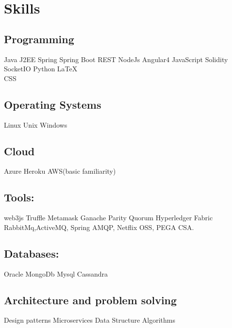 \documentclass[]{deedy-resume-openfont}
\begin{document}
\begin{minipage}[t]{0.33\textwidth}

\section{Skills}
\subsection{Programming}
Java \textbullet{} J2EE \textbullet{} Spring \textbullet{} Spring Boot \textbullet{} REST 
\textbullet{} NodeJs \textbullet{} Angular4  \textbullet{} JavaScript \textbullet{} Solidity \\
 
SocketIO \textbullet{} Python \textbullet{} \LaTeX\ \\
CSS \\
\sectionsep
\subsection{Operating Systems}
Linux \textbullet{} Unix   \textbullet{} Windows
\sectionsep
\subsection{Cloud}
Azure \textbullet{} Heroku \textbullet{} AWS(basic familiarity) 
\sectionsep
\subsection{Tools:}
\textbullet{} web3js \textbullet{} Truffle \textbullet{} Metamask \textbullet{} Ganache \textbullet{} Parity
\textbullet{} Quorum \textbullet{} Hyperledger Fabric \textbullet{} RabbitMq,\textbullet{}ActiveMQ, \textbullet{} Spring AMQP, \textbullet{} 
Netflix OSS, PEGA CSA.
\sectionsep
\subsection{Databases:}
Oracle\textbullet{} MongoDb \textbullet{} Mysql \textbullet{}Cassandra 
\sectionsep
\subsection{Architecture and problem solving}
Design patterns \textbullet{} Microservices \textbullet{} Data Structure \textbullet{} Algorithms \\


\end{minipage}
\end{document}
